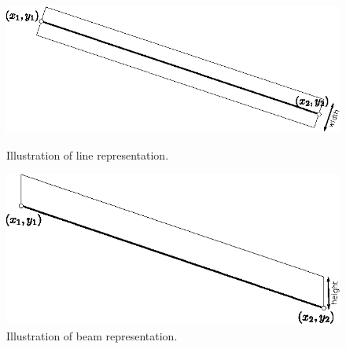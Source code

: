 \begin{figure}[b]
    \centering
    \begin{minipage}[t]{.5\textwidth}
        \centering
        \includegraphics[scale=.8]{Figures/primitive-line.eps}
        \caption{Illustration of line representation.}
        \label{fig:primitive-line}
    \end{minipage}%
    \begin{minipage}[t]{.5\textwidth}
        \centering
        \includegraphics[scale=.8]{Figures/primitive-beam.eps}
        \caption{Illustration of beam representation.}
        \label{fig:primitive-beam}
    \end{minipage}
\end{figure}

